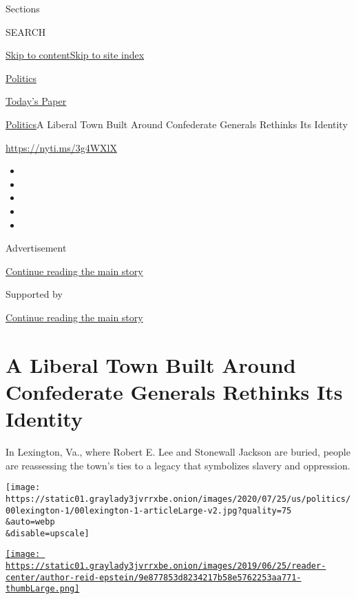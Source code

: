 Sections

SEARCH

\protect\hyperlink{site-content}{Skip to
content}\protect\hyperlink{site-index}{Skip to site index}

\href{https://www.nytimes3xbfgragh.onion/section/politics}{Politics}

\href{https://myaccount.nytimes3xbfgragh.onion/auth/login?response_type=cookie\&client_id=vi}{}

\href{https://www.nytimes3xbfgragh.onion/section/todayspaper}{Today's
Paper}

\href{/section/politics}{Politics}\textbar{}A Liberal Town Built Around
Confederate Generals Rethinks Its Identity

\url{https://nyti.ms/3g4WXlX}

\begin{itemize}
\item
\item
\item
\item
\item
\end{itemize}

Advertisement

\protect\hyperlink{after-top}{Continue reading the main story}

Supported by

\protect\hyperlink{after-sponsor}{Continue reading the main story}

\hypertarget{a-liberal-town-built-around-confederate-generals-rethinks-its-identity}{%
\section{A Liberal Town Built Around Confederate Generals Rethinks Its
Identity}\label{a-liberal-town-built-around-confederate-generals-rethinks-its-identity}}

In Lexington, Va., where Robert E. Lee and Stonewall Jackson are buried,
people are reassessing the town's ties to a legacy that symbolizes
slavery and oppression.

\texttt{[image: https://static01.graylady3jvrrxbe.onion/images/2020/07/25/us/politics/00lexington-1/00lexington-1-articleLarge-v2.jpg?quality=75\\\&auto=webp\\\&disable=upscale]}

\href{https://www.nytimes3xbfgragh.onion/by/reid-j-epstein}{\texttt{[image: https://static01.graylady3jvrrxbe.onion/images/2019/06/25/reader-center/author-reid-epstein/9e877853d8234217b58e5762253aa771-thumbLarge.png]}}

